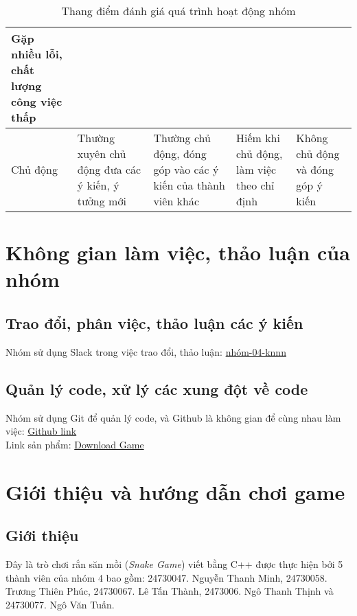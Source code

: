 \documentclass[12pt]{report}
\begin{document}
\begin{table}[H]
{\begin{tabularx}{\textwidth}{|p{60pt}|X|X|X|X|}
            Gặp nhiều lỗi, chất lượng công việc thấp                               \\
            \hline
            Chủ động                                                             &
            Thường xuyên chủ động đưa các ý kiến, ý tưởng mới                    &
            Thường chủ động, đóng góp vào các ý kiến của thành viên khác         &
            Hiếm khi chủ động, làm việc theo chỉ định                            &
            Không chủ động và đóng góp ý kiến                                      \\
            \hline
        \end{tabularx}
    }
    \caption{Thang điểm đánh giá quá trình hoạt động nhóm}
    \label{tab:teamwork_rubric}
\end{table}

\chapter{Không gian làm việc, thảo luận của nhóm}
\label{sec:work_space}

\section{Trao đổi, phân việc, thảo luận các ý kiến}
Nhóm sử dụng Slack trong việc trao đổi, thảo luận: \href{https://ss004e11cn1.slack.com/archives/C07T94K918U}{nhóm-04-knnn}
\section{Quản lý code, xử lý các xung đột về code}
Nhóm sử dụng Git để quản lý code, và Github là không gian để cùng nhau làm việc: \href{https://github.com/ThinhNgo96/snake_game}{Github link} \\
Link sản phẩm: \href{https://github.com/ThinhNgo96/snake_game/releases}{Download Game}

\chapter{Giới thiệu và hướng dẫn chơi game}
\label{sec:game_tutorial}

\section{Giới thiệu}

Đây là trò chơi rắn săn mồi (\textit{Snake Game}) viết bằng C++ được thực hiện bởi 5 thành viên của nhóm 4 bao gồm:
24730047. Nguyễn Thanh Minh, 24730058. Trương Thiên Phúc, 24730067. Lê Tấn Thành, 2473006. Ngô Thanh Thịnh và 24730077. Ngô Văn Tuấn.
\end{document}
